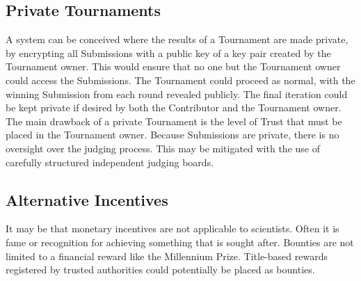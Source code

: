\documentclass[a4paper, 10pt, conference]{ieeeconf}      %
\begin{document}
\subsection{Private Tournaments}\label{privateTournaments}
A system can be conceived where the results of a Tournament are made private, by encrypting all Submissions with a public key of a key pair created by the Tournament owner. 
This would ensure that no one but the Tournament owner could access the Submissions. 
The Tournament could proceed as normal, with the winning Submission from each round revealed publicly. 
The final iteration could be kept private if desired by both the Contributor and the Tournament owner. 
The main drawback of a private Tournament is the level of Trust that must be placed in the Tournament owner. 
Because Submissions are private, there is no oversight over the judging process. 
This may be mitigated with the use of carefully structured independent judging boards.

\subsection{Alternative Incentives}\label{alternative incentives}
It may be that monetary incentives are not applicable to scientists. 
Often it is fame or recognition for achieving something that is sought after. 
Bounties are not limited to a financial reward like the Millennium Prize. 
Title-based rewards registered by trusted authorities could potentially be placed as bounties.

\printbibliography
\end{document}
